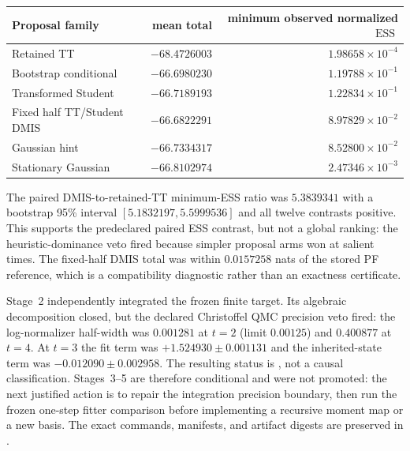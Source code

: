 \documentclass[11pt]{article}
\DeclareMathOperator{\ESS}{ESS}
\begin{document}
\begin{center}
\begin{tabular}{lrr}
\toprule
Proposal family & mean total & minimum observed normalized $\ESS$\\
\midrule
Retained TT & $-68.4726003$ & $1.98658\times10^{-4}$\\
Bootstrap conditional & $-66.6980230$ & $1.19788\times10^{-1}$\\
Transformed Student & $-66.7189193$ & $1.22834\times10^{-1}$\\
Fixed half TT/Student DMIS & $-66.6822291$ & $8.97829\times10^{-2}$\\
Gaussian hint & $-66.7334317$ & $8.52800\times10^{-2}$\\
Stationary Gaussian & $-66.8102974$ & $2.47346\times10^{-3}$\\
\bottomrule
\end{tabular}
\end{center}

The paired DMIS-to-retained-TT minimum-ESS ratio was $5.3839341$ with a
bootstrap 95\% interval $[5.1832197,5.5999536]$ and all twelve contrasts
positive. This supports the predeclared paired ESS contrast, but not a global
ranking: the heuristic-dominance veto fired because simpler proposal arms won
at salient times. The fixed-half DMIS total was within $0.0157258$ nats of the
stored PF reference, which is a compatibility diagnostic rather than an
exactness certificate.

Stage~2 independently integrated the frozen finite target. Its algebraic
decomposition closed, but the declared Christoffel QMC precision veto fired:
the log-normalizer half-width was $0.001281$ at $t=2$ (limit $0.00125$) and
$0.400877$ at $t=4$. At $t=3$ the fit term was
$+1.524930\pm0.001131$ and the inherited-state term was
$-0.012090\pm0.002958$. The resulting status is
, not a causal classification. Stages~3--5 are
therefore conditional and were not promoted: the next justified action is to
repair the integration precision boundary, then run the frozen one-step
fitter comparison before implementing a recursive moment map or a new basis.
The exact commands, manifests, and artifact digests are preserved in
.

\fi

\end{document}
